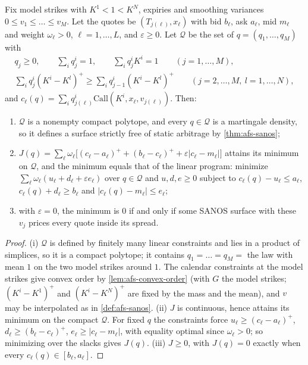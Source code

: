 \begin{proposition}\label{prop:afs-lp}
Fix model strikes with $K^1<1<K^N$, expiries and smoothing variances $0\le v_1\le\dots\le v_M$. Let the quotes be
$(T_{j(\ell)},x_\ell)$ with bid $b_\ell$, ask $a_\ell$, mid $m_\ell$ and weight $\omega_\ell>0$, $\ell=1,\dots,L$, and $\varepsilon\ge0$.
Let $\mathcal Q$ be the set of $q=(q_1,\dots,q_M)$ with
\begin{equation}\label{eq:afs-lp}
\begin{gathered}
  q_j\ge0,\qquad\sum_iq_j^i=1,\qquad\sum_iq_j^iK^i=1\qquad(j=1,\dots,M),\\
  \sum_iq_j^i(K^i-K^l)^+\ge\sum_iq_{j-1}^i(K^i-K^l)^+\qquad(j=2,\dots,M,\ l=1,\dots,N),
\end{gathered}
\end{equation}
and $c_\ell(q)=\sum_iq_{j(\ell)}^i\mathrm{Call}(K^i,x_\ell,v_{j(\ell)})$. Then:
\begin{enumerate}[label=(\roman*)]
  \item $\mathcal Q$ is a nonempty compact polytope, and every $q\in\mathcal Q$ is a martingale density, so it defines a
    surface strictly free of static arbitrage by \cref{thm:afs-sanos};
  \item $J(q)=\sum_\ell\omega_\ell\big[(c_\ell-a_\ell)^++(b_\ell-c_\ell)^++\varepsilon|c_\ell-m_\ell|\big]$ attains its minimum on $\mathcal Q$, and
    the minimum equals that of the linear program: minimize $\sum_\ell\omega_\ell(u_\ell+d_\ell+\varepsilon e_\ell)$ over $q\in\mathcal Q$ and
    $u,d,e\ge0$ subject to $c_\ell(q)-u_\ell\le a_\ell$, $c_\ell(q)+d_\ell\ge b_\ell$ and $|c_\ell(q)-m_\ell|\le e_\ell$;
  \item with $\varepsilon=0$, the minimum is $0$ if and only if some SANOS surface with these $v_j$ prices every quote inside its
    spread.
\end{enumerate}
\end{proposition}

\begin{proof}
(i) $\mathcal Q$ is defined by finitely many linear constraints and lies in a product of simplices, so it is a compact polytope; it
contains $q_1=\dots=q_M=$ the law with mean $1$ on the two model strikes around $1$. The calendar constraints at the model
strikes give convex order by \cref{lem:afs-convex-order} (with $G$ the model strikes; $(K^i-K^1)^+$ and $(K^i-K^N)^+$ are
fixed by the mass and the mean), and $v$ may be interpolated as in \cref{def:afs-sanos}. (ii) $J$ is continuous, hence
attains its minimum on the compact $\mathcal Q$. For fixed $q$ the constraints force $u_\ell\ge(c_\ell-a_\ell)^+$, $d_\ell\ge(b_\ell-c_\ell)^+$,
$e_\ell\ge|c_\ell-m_\ell|$, with equality optimal since $\omega_\ell>0$; so minimizing over the slacks gives $J(q)$. (iii) $J\ge0$, with
$J(q)=0$ exactly when every $c_\ell(q)\in[b_\ell,a_\ell]$.
\end{proof}

